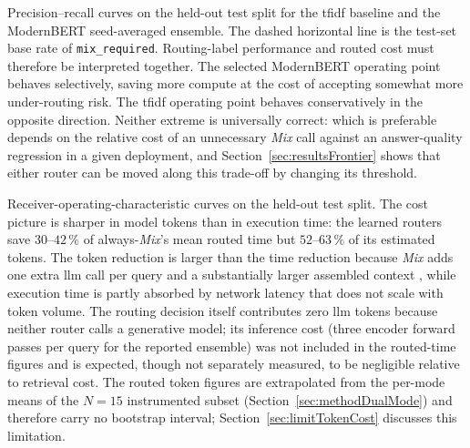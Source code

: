 \documentclass[english, bibtex]{kththesis}               %
\numberwithin{listing}{chapter}
\providecommand{\DIFaddtex}[1]{{\protect\color{blue} \sf #1}} %
\providecommand{\DIFdeltex}[1]{{\protect\color{red} \scriptsize #1}} %
\providecommand{\DIFaddbegin}{} %
\providecommand{\DIFaddend}{} %
\providecommand{\DIFdelbegin}{} %
\providecommand{\DIFdelend}{} %
\providecommand{\DIFdelFL}[1]{\DIFdel{#1}} %
\providecommand{\DIFadd}[1]{\texorpdfstring{\DIFaddtex{#1}}{#1}} %
\providecommand{\DIFdel}[1]{\texorpdfstring{\DIFdeltex{#1}}{}} %
\begin{document}
\DIFdelbegin %
{%
\DIFdelFL{Precision--recall curves on the held-out test split for the \gls{tfidf} baseline and the ModernBERT seed-averaged ensemble. The dashed horizontal line is the test-set base rate of \texttt{mix\_required}.}}
\DIFdelend \DIFaddbegin \DIFadd{Routing-label performance and routed cost must therefore be interpreted together. The selected ModernBERT operating point behaves selectively, saving more compute at the cost of accepting somewhat more under-routing risk. The \gls{tfidf} operating point behaves conservatively in the opposite direction. Neither extreme is universally correct: which is preferable depends on the relative cost of an unnecessary \emph{Mix} call against an answer-quality regression in a given deployment, and Section~\ref{sec:resultsFrontier} shows that either router can be moved along this trade-off by changing its threshold.
}\DIFaddend 

\DIFdelbegin %
{%
\DIFdelFL{Receiver-operating-characteristic curves on the held-out test split.}}
\DIFdelend \DIFaddbegin \DIFadd{The cost picture is sharper in model tokens than in execution time: the learned routers save $30$--$42\,\%$ of always-\emph{Mix}'s mean routed time but $52$--$63\,\%$ of its estimated tokens. The token reduction is larger than the time reduction because \emph{Mix} adds one extra \gls{llm} call per query and a substantially larger assembled context \cite{lightrag2024,microsoft2024graphragcosts}, while execution time is partly absorbed by network latency that does not scale with token volume. The routing decision itself contributes zero \gls{llm} tokens because neither router calls a generative model; its inference cost (three encoder forward passes per query for the reported ensemble) was not included in the routed-time figures and is expected, though not separately measured, to be negligible relative to retrieval cost. The routed token figures are extrapolated from the per-mode means of the $N = 15$ instrumented subset (Section~\ref{sec:methodDualMode}) and therefore carry no bootstrap interval; Section~\ref{sec:limitTokenCost} discusses this limitation.
}\DIFaddend 
\end{document}
